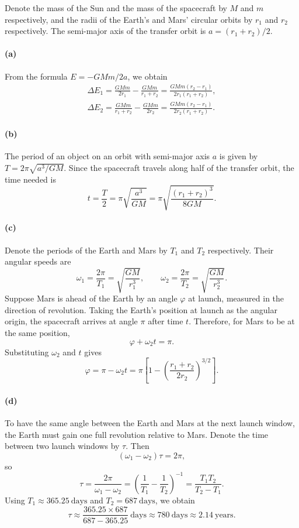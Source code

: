 \documentclass{article}
\begin{document}
\begin{solution}
	Denote the mass of the Sun and the mass of the spacecraft by $M$ and $m$ respectively, and the radii of the Earth's and Mars' circular orbits by $r_1$ and $r_2$ respectively. The semi-major axis of the transfer orbit is $a=(r_1+r_2)/2$.

	\paragraph{(a)} From the formula $E = -GMm/2a$, we obtain
	\begin{gather*}
		\Delta E_1 = \frac{GMm}{2r_1} - \frac{GMm}{r_1+r_2}
		= \frac{GMm(r_2-r_1)}{2r_1(r_1+r_2)}, \\
		\Delta E_2 = \frac{GMm}{r_1+r_2} - \frac{GMm}{2r_2}
		= \frac{GMm(r_2-r_1)}{2r_2(r_1+r_2)}.
	\end{gather*}

	\paragraph{(b)} The period of an object on an orbit with semi-major axis $a$ is given by $T = 2\pi\sqrt{a^3/GM}$. Since the spacecraft travels along half of the transfer orbit, the time needed is
	\[ t = \frac{T}{2} = \pi\sqrt{\frac{a^3}{GM}}
	= \pi\sqrt{\frac{(r_1+r_2)^3}{8GM}}. \]

	\paragraph{(c)} Denote the periods of the Earth and Mars by $T_1$ and $T_2$ respectively. Their angular speeds are
	\[ \omega_1 = \frac{2\pi}{T_1} = \sqrt{\frac{GM}{r_1^3}}, \qquad
	\omega_2 = \frac{2\pi}{T_2} = \sqrt{\frac{GM}{r_2^3}}. \]
	Suppose Mars is ahead of the Earth by an angle $\varphi$ at launch, measured in the direction of revolution. Taking the Earth's position at launch as the angular origin, the spacecraft arrives at angle $\pi$ after time $t$. Therefore, for Mars to be at the same position,
	\[ \varphi + \omega_2 t = \pi. \]
	Substituting $\omega_2$ and $t$ gives
	\[ \varphi = \pi-\omega_2 t
	= \pi\left[1-\left(\frac{r_1+r_2}{2r_2}\right)^{3/2}\right]. \]

	\paragraph{(d)} To have the same angle between the Earth and Mars at the next launch window, the Earth must gain one full revolution relative to Mars. Denote the time between two launch windows by $\tau$. Then
	\[ (\omega_1-\omega_2)\tau = 2\pi, \]
	so
	\[ \tau = \frac{2\pi}{\omega_1-\omega_2}
	= \left(\frac{1}{T_1}-\frac{1}{T_2}\right)^{-1}
	= \frac{T_1T_2}{T_2-T_1}. \]
	Using $T_1\approx365.25\ \mathrm{days}$ and $T_2=687\ \mathrm{days}$, we obtain
	\[ \tau \approx \frac{365.25\times687}{687-365.25}\ \mathrm{days}
	\approx780\ \mathrm{days}\approx2.14\ \mathrm{years}. \]
\end{solution}
\end{document}
